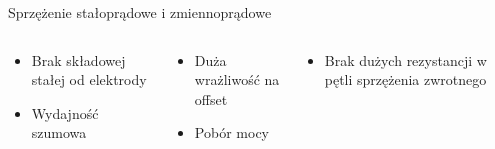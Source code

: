 \begin{frame}{Sprzężenie stałoprądowe i zmiennoprądowe}
\begin{columns}
{    %
    \begin{exampleblock}{}
        \begin{itemize}
            \item Brak składowej stałej od elektrody
            \item Wydajność szumowa 
        \end{itemize}
    \end{exampleblock}

    }

       

    {\renewcommand\normalsize{\small}%
    \normalsize
    \vspace{-1em} %

    \begin{alertblock}{}
        \begin{itemize}
            \item Duża wrażliwość na offset
            \item Pobór mocy
        \end{itemize}
    \end{alertblock}
    \vspace{-1em} %

    \begin{exampleblock}{}
        \begin{itemize}
            \item Brak dużych rezystancji w pętli sprzężenia zwrotnego
        \end{itemize}
    \end{exampleblock}
    }

    \end{columns}

\end{frame}
